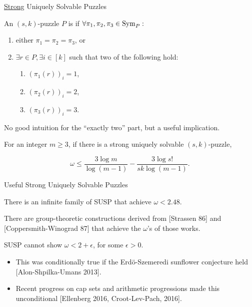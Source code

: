 \documentclass[t,10pt,
mathserif,xcolor=dvipsnames]{beamer}
\begin{document}
\begin{myframe}{\uline{Strong} Uniquely Solvable Puzzles}

  \begin{definition}

    An $(s,k)$-puzzle $P$ is \emph{} if
    $\forall \pi_1, \pi_2, \pi_3 \in \mathrm{Sym}_{P}:$
    \begin{enumerate}
    \item either $\pi_1 = \pi_2 = \pi_3$, or
    \item $\exists r \in P, \exists i \in [k]$ such that  two
      of the following hold:
      \begin{enumerate}
      \item $(\pi_1(r))_i = 1$,
      \item $(\pi_2(r))_i = 2$,
      \item $(\pi_3(r))_i = 3$.
      \end{enumerate}
    \end{enumerate}

  \end{definition}

  No good intuition for the ``exactly two'' part, but a useful
  implication.

  \begin{lemma}
    For an integer $m \ge 3$, if there is a strong uniquely solvable
    $(s,k)$-puzzle, 

    $$\omega \le \frac{3 \log m}{\log(m-1)} - \frac{3 \log s!}{sk \log(m-1)}.$$
  \end{lemma}
  
\end{myframe}

\begin{myframe}{Useful Strong Uniquely Solvable Puzzles}

  \begin{lemma}
   There is an infinite family of SUSP that achieve $\omega < 2.48$.
  \end{lemma}

  \medskip
  There are group-theoretic constructions derived from [Strassen 86]
  and [Coppersmith-Winograd 87] that achieve the $\omega$'s of those
  works.

  \bigskip
  
  \begin{lemma}[{[BCCGU 16]}]
  SUSP cannot show $\omega < 2 + \epsilon$, for some $\epsilon >
  0$.
  \end{lemma}
  \begin{itemize}
  \item This was conditionally true if the Erd\"{o}-Szemeredi
    sunflower conjecture held [Alon-Shpilka-Umans 2013].
  \item Recent progress on cap sets and arithmetic progressions made
    this unconditional [Ellenberg 2016, Croot-Lev-Pach, 2016].
  \end{itemize}

  
\end{myframe}
\end{document}
